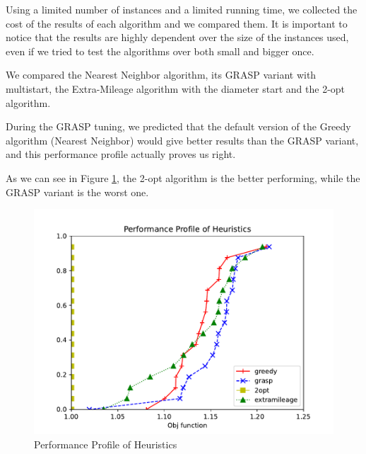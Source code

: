 Using a limited number of instances and a limited running time, we collected the cost of the results of each algorithm and we compared them. It is important to notice that the results are highly dependent over the size of the instances used, even if we tried to test the algorithms over both small and bigger once.

We compared the Nearest Neighbor algorithm, its GRASP variant with multistart, the Extra-Mileage algorithm with the diameter start and the 2-opt algorithm.

During the GRASP tuning, we predicted that the default version of the Greedy algorithm (Nearest Neighbor) would give better results than the GRASP variant, and this performance profile actually proves us right.

As we can see in Figure \ref{fig:gge2}, the 2-opt algorithm is the better performing, while the GRASP variant is the worst one. 

\begin{figure}[!h]
    \centering
    \includegraphics[width=\textwidth]{images/gge2.pdf}
    \caption{Performance Profile of Heuristics}
    \label{fig:gge2}
\end{figure}

